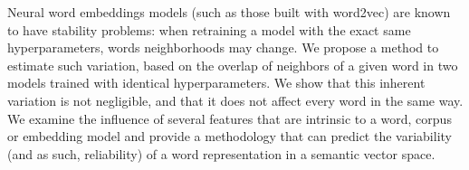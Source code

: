 Neural word embeddings models (such as those built with word2vec) are known to have stability problems: when retraining a model with the exact same hyperparameters, words neighborhoods may change. We propose a method to estimate such variation, based on the overlap of neighbors of a given word in two models trained with identical hyperparameters. We show that this inherent variation is not negligible, and that it does not affect every word in the same way. We examine the influence of several features that are intrinsic to a word, corpus or embedding model and provide a methodology that can predict the variability (and as such, reliability) of a word representation in a semantic vector space.
